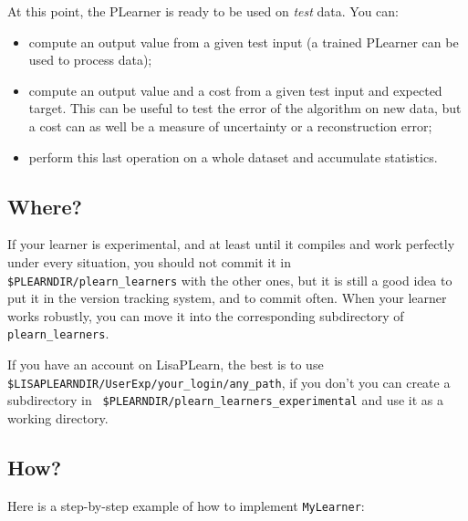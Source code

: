 \documentclass[11pt]{book}
\begin{document}
At this point, the PLearner is ready to be used on {\em test} data. You can:
\begin{itemize}

  \item compute an output value from a given test input (a trained
  PLearner can be used to process data);

  \item compute an output value and a cost from a given test input and
  expected target. This can be useful to test the error of the algorithm
  on new data, but a cost can as well be a measure of uncertainty or a
  reconstruction error;

  \item perform this last operation on a whole dataset and accumulate
  statistics.

\end{itemize}

\subsection{Where?}

If your learner is experimental, and at least until it compiles and
work perfectly under every situation, you should not commit it in {\tt
\$PLEARNDIR/plearn\_learners} with the other ones, but it is still a
good idea to put it in the version tracking system, and to commit often.
When your learner works robustly, you can move it into the corresponding
subdirectory of {\tt plearn\_learners}.

If you have an account on LisaPLearn, the best is to use
{\tt \$LISAPLEARNDIR/UserExp/your\_login/any\_path},
if you don't you can create a subdirectory in {\tt
\$PLEARNDIR/plearn\_learners\_experimental} and use it as a working
directory.

\subsection{How?}

Here is a step-by-step example of how to implement {\tt MyLearner}:
\end{document}
